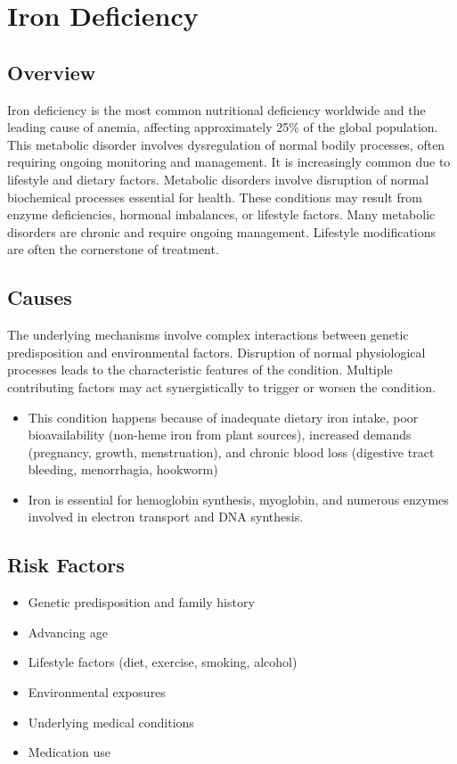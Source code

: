 \chapter{Iron Deficiency}
\label{sec:Iron Deficiency}

\section{Overview}
Iron deficiency is the most common nutritional deficiency worldwide and the leading cause of anemia, affecting approximately 25\% of the global population. This metabolic disorder involves dysregulation of normal bodily processes, often requiring ongoing monitoring and management. It is increasingly common due to lifestyle and dietary factors. Metabolic disorders involve disruption of normal biochemical processes essential for health. These conditions may result from enzyme deficiencies, hormonal imbalances, or lifestyle factors. Many metabolic disorders are chronic and require ongoing management. Lifestyle modifications are often the cornerstone of treatment.
\section{Causes}
The underlying mechanisms involve complex interactions between genetic predisposition and environmental factors. Disruption of normal physiological processes leads to the characteristic features of the condition. Multiple contributing factors may act synergistically to trigger or worsen the condition.

\begin{itemize}[noitemsep]
  \item This condition happens because of inadequate dietary iron intake, poor bioavailability (non-heme iron from plant sources), increased demands (pregnancy, growth, menstruation), and chronic blood loss (digestive tract bleeding, menorrhagia, hookworm)
  \item Iron is essential for hemoglobin synthesis, myoglobin, and numerous enzymes involved in electron transport and DNA synthesis.
\end{itemize}
\section{Risk Factors}
\begin{itemize}[noitemsep]
  \item Genetic predisposition and family history
  \item Advancing age
  \item Lifestyle factors (diet, exercise, smoking, alcohol)
  \item Environmental exposures
  \item Underlying medical conditions
  \item Medication use
\end{itemize}
